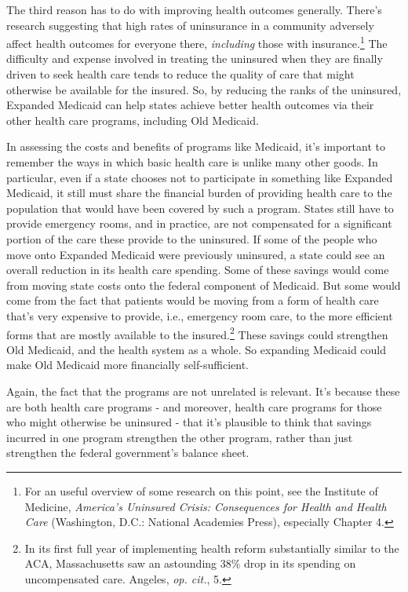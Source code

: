 \documentclass[
  11pt,
  letterpaper,
  DIV=11,
  numbers=noendperiod,
  twoside]{scrartcl}
\begin{document}
The third reason has to do with improving health outcomes generally.
There's research suggesting that high rates of uninsurance in a
community adversely affect health outcomes for everyone there,
\emph{including} those with insurance.\footnote{For an useful overview
  of some research on this point, see the Institute of Medicine,
  \emph{America's Uninsured Crisis: Consequences for Health and Health
  Care} (Washington, D.C.: National Academies Press), especially Chapter
  4.} The difficulty and expense involved in treating the uninsured when
they are finally driven to seek health care tends to reduce the quality
of care that might otherwise be available for the insured. So, by
reducing the ranks of the uninsured, Expanded Medicaid can help states
achieve better health outcomes via their other health care programs,
including Old Medicaid.

In assessing the costs and benefits of programs like Medicaid, it's
important to remember the ways in which basic health care is unlike many
other goods. In particular, even if a state chooses not to participate
in something like Expanded Medicaid, it still must share the financial
burden of providing health care to the population that would have been
covered by such a program. States still have to provide emergency rooms,
and in practice, are not compensated for a significant portion of the
care these provide to the uninsured. If some of the people who move onto
Expanded Medicaid were previously uninsured, a state could see an
overall reduction in its health care spending. Some of these savings
would come from moving state costs onto the federal component of
Medicaid. But some would come from the fact that patients would be
moving from a form of health care that's very expensive to provide,
i.e., emergency room care, to the more efficient forms that are mostly
available to the insured.\footnote{In its first full year of
  implementing health reform substantially similar to the ACA,
  Massachusetts saw an astounding 38\% drop in its spending on
  uncompensated care. Angeles, \emph{op. cit.}, 5.} These savings could
strengthen Old Medicaid, and the health system as a whole. So expanding
Medicaid could make Old Medicaid more financially self-sufficient.

Again, the fact that the programs are not unrelated is relevant. It's
because these are both health care programs - and moreover, health care
programs for those who might otherwise be uninsured - that it's
plausible to think that savings incurred in one program strengthen the
other program, rather than just strengthen the federal government's
balance sheet.
\end{document}
